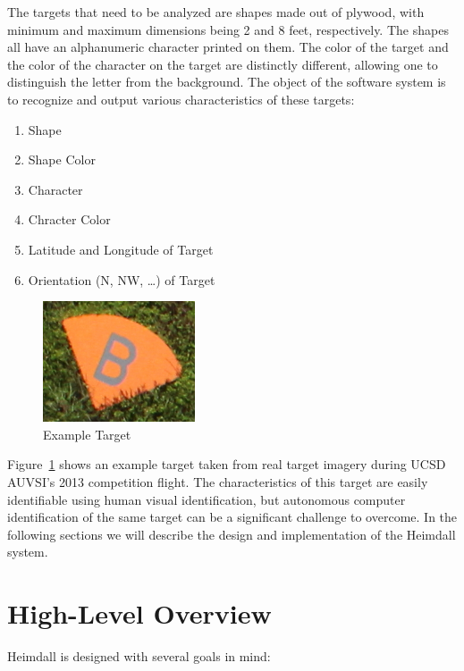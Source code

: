 \documentclass{article}
\begin{document}
The targets that need to be analyzed are shapes made out of plywood, with minimum and maximum dimensions being 2 and 8 feet, respectively. The shapes all have an alphanumeric character printed on them. The color of the target and the color of the character on the target are distinctly different, allowing one to distinguish the letter from the background. The object of the software system is to recognize and output various characteristics of these targets:

\begin{enumerate}
\item Shape
\item Shape Color
\item Character
\item Chracter Color
\item Latitude and Longitude of Target
\item Orientation (N, NW, \ldots) of Target
\end{enumerate}

\begin{figure}[!hbtp]
	\centering
		\includegraphics[width=0.4\textwidth]{target_example.jpg}
	\caption{Example Target}
	\label{fig:example_target}
\end{figure}

Figure~\ref{fig:example_target} shows an example target taken from real target imagery during UCSD AUVSI's 2013 competition flight. The characteristics of this target are easily identifiable using human visual identification, but autonomous computer identification of the same target can be a significant challenge to overcome. In the following sections we will describe the design and implementation of the Heimdall system.

\section{High-Level Overview}

Heimdall is designed with several goals in mind: 
 
\end{document}
